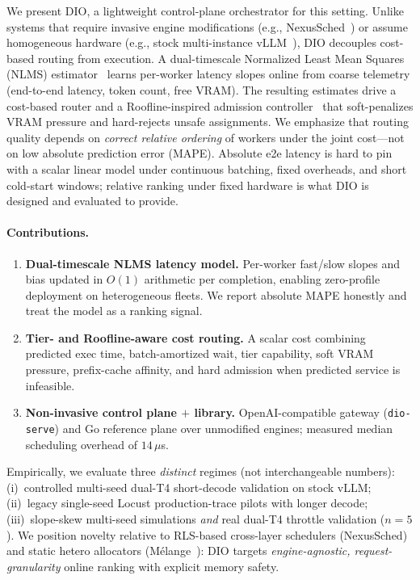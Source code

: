 \documentclass[10pt,twocolumn,letterpaper]{article}
\begin{document}
We present DIO, a lightweight control-plane orchestrator for this setting. Unlike systems that require invasive engine modifications (e.g., NexusSched~\cite{nexussched}) or assume homogeneous hardware (e.g., stock multi-instance vLLM~\cite{vllm}), DIO decouples cost-based routing from execution. A dual-timescale Normalized Least Mean Squares (NLMS) estimator~\cite{haykin2002adaptive} learns per-worker latency slopes online from coarse telemetry (end-to-end latency, token count, free VRAM). The resulting estimates drive a cost-based router and a Roofline-inspired admission controller~\cite{williams2009roofline} that soft-penalizes VRAM pressure and hard-rejects unsafe assignments. We emphasize that routing quality depends on \emph{correct relative ordering} of workers under the joint cost---not on low absolute prediction error (MAPE). Absolute e2e latency is hard to pin with a scalar linear model under continuous batching, fixed overheads, and short cold-start windows; relative ranking under fixed hardware is what DIO is designed and evaluated to provide.

\paragraph{Contributions.}
\begin{enumerate}
    \item \textbf{Dual-timescale NLMS latency model.} Per-worker fast/slow slopes and bias updated in $O(1)$ arithmetic per completion, enabling zero-profile deployment on heterogeneous fleets. We report absolute MAPE honestly and treat the model as a ranking signal.
    \item \textbf{Tier- and Roofline-aware cost routing.} A scalar cost combining predicted exec time, batch-amortized wait, tier capability, soft VRAM pressure, prefix-cache affinity, and hard admission when predicted service is infeasible.
    \item \textbf{Non-invasive control plane $+$ library.} OpenAI-compatible gateway (\texttt{dio-serve}) and Go reference plane over unmodified engines; measured median scheduling overhead of $14\,\mu$s.
\end{enumerate}
Empirically, we evaluate three \emph{distinct} regimes (not interchangeable numbers): (i)~controlled multi-seed dual-T4 short-decode validation on stock vLLM; (ii)~legacy single-seed Locust production-trace pilots with longer decode; (iii)~slope-skew multi-seed simulations \emph{and} real dual-T4 throttle validation ($n{=}5$). We position novelty relative to RLS-based cross-layer schedulers (NexusSched) and static hetero allocators (M\'elange~\cite{melange}): DIO targets \emph{engine-agnostic, request-granularity} online ranking with explicit memory safety.
\end{document}
